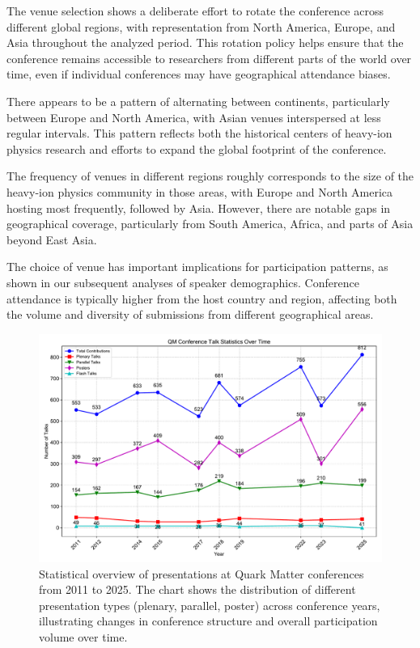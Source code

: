 \documentclass[a4paper,11pt]{article}
\begin{document}
The venue selection shows a deliberate effort to rotate the conference across different global regions, with representation from North America, Europe, and Asia throughout the analyzed period. This rotation policy helps ensure that the conference remains accessible to researchers from different parts of the world over time, even if individual conferences may have geographical attendance biases.

There appears to be a pattern of alternating between continents, particularly between Europe and North America, with Asian venues interspersed at less regular intervals. This pattern reflects both the historical centers of heavy-ion physics research and efforts to expand the global footprint of the conference.

The frequency of venues in different regions roughly corresponds to the size of the heavy-ion physics community in those areas, with Europe and North America hosting most frequently, followed by Asia. However, there are notable gaps in geographical coverage, particularly from South America, Africa, and parts of Asia beyond East Asia.

The choice of venue has important implications for participation patterns, as shown in our subsequent analyses of speaker demographics. Conference attendance is typically higher from the host country and region, affecting both the volume and diversity of submissions from different geographical areas.

\begin{figure}[H]
\centering
\includegraphics[width=\textwidth]{figures/QM_talk_statistics.pdf}
\caption{Statistical overview of presentations at Quark Matter conferences from 2011 to 2025. The chart shows the distribution of different presentation types (plenary, parallel, poster) across conference years, illustrating changes in conference structure and overall participation volume over time.}
\label{fig:talk_statistics}
\end{figure}
\end{document}
